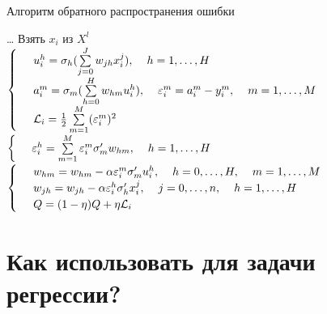 \documentclass[10pt]{beamer}
\begin{document}
{
\begin{frame}{Алгоритм обратного распространения ошибки}
  \begin{algorithmic}[1]
     \State \dots
       \State Взять $x_i$ из $X^l$
       \pause
       \State 	$\begin{cases}
	\hspace{5mm} u^h_i = \sigma_h (\sum\limits_{j=0}^J w_{jh} x_i^j), \hspace{4mm} h = 1, \dots, H\\
	\hspace{5mm} a^m_i = \sigma_m (\sum\limits_{h=0}^H w_{hm} u_i^h), \hspace{4mm} \varepsilon_i^m = a_i^m - y_i^m, \hspace{4mm} m = 1, \dots, M\\
	\hspace{5mm} \mathcal{L}_i = \frac{1}{2} \sum\limits_{m=1}^M (\varepsilon_i^m)^2\\
	\end{cases}$\\
	\pause
	$\begin{cases} \hspace{5mm} \varepsilon_i^h = \sum\limits_{m=1}^M \varepsilon_i^m \sigma'_m w_{hm}, \hspace{4mm} h = 1, \dots, H\end{cases}$\\
	\pause
	$\begin{cases} \hspace{5mm} w_{hm} = w_{hm} - \alpha \varepsilon_i^m \sigma'_m u_i^h, \hspace{4mm} h = 0, \dots, H, \hspace{4mm} m = 1, \dots, M\\
	\hspace{5mm} w_{jh} = w_{jh} - \alpha \varepsilon_i^h \sigma'_h x_i^j, \hspace{4mm} j = 0, \dots, n, \hspace{4mm} h = 1, \dots, H\\
	\hspace{5mm} Q = (1 - \eta)Q + \eta \mathcal{L}_i \end{cases}$
     \EndRepeat
    \EndFunction
  \end{algorithmic}    
\end{frame}
}

\section{Как использовать для задачи регрессии?}
\end{document}
